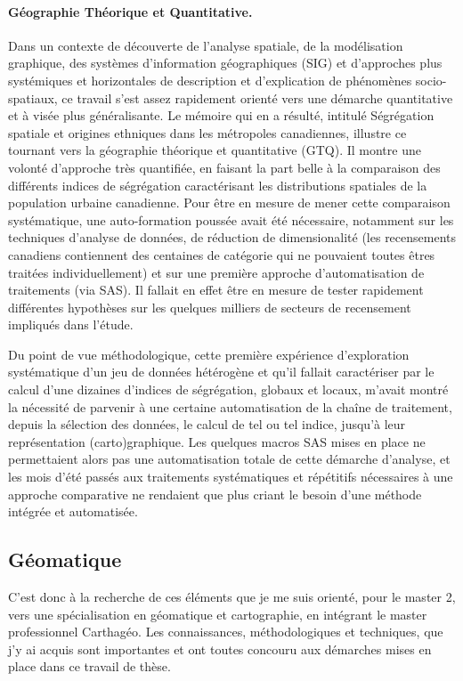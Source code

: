 \paragraph{Géographie Théorique et Quantitative.}
Dans un contexte de découverte de l'analyse spatiale, de la modélisation graphique, des systèmes d'information géographiques (SIG) et d'approches plus systémiques et horizontales de description et d'explication de phénomènes socio-spatiaux, ce travail s'est assez rapidement orienté vers une démarche quantitative et à visée plus généralisante.
Le mémoire qui en a résulté, intitulé \og Ségrégation spatiale et origines ethniques dans les métropoles canadiennes\fg{}, illustre ce tournant vers la géographie théorique et quantitative (GTQ).
Il montre une volonté d'approche très quantifiée, en faisant la part belle à la comparaison des différents indices de ségrégation caractérisant les distributions spatiales de la population urbaine canadienne.
Pour être en mesure de mener cette comparaison systématique, une auto-formation poussée avait été nécessaire, notamment sur les techniques d'analyse de données, de réduction de dimensionalité (les recensements canadiens contiennent des centaines de catégorie qui ne pouvaient toutes êtres traitées individuellement) et sur une première approche d'automatisation de traitements (via SAS).
Il fallait en effet être en mesure de tester rapidement différentes hypothèses sur les quelques milliers de \og secteurs de recensement\fg{} impliqués dans l'étude.

Du point de vue méthodologique, cette première expérience d'exploration systématique d'un jeu de données hétérogène et qu'il fallait caractériser par le calcul d'une dizaines d'indices de ségrégation, globaux et locaux, m'avait montré la nécessité de parvenir à une certaine automatisation de la chaîne de traitement, depuis la sélection des données, le calcul de tel ou tel indice, jusqu'à leur représentation (carto)graphique.
Les quelques macros SAS mises en place ne permettaient alors pas une automatisation totale de cette démarche d'analyse, et les mois d'été passés aux traitements systématiques et répétitifs nécessaires à une approche comparative ne rendaient que plus criant le besoin d'une méthode intégrée et automatisée.

\subsection{Géomatique}

C'est donc à la recherche de ces éléments que je me suis orienté, pour le master 2, vers une spécialisation en géomatique et cartographie, en intégrant le master professionnel Carthagéo.
Les connaissances, méthodologiques et techniques, que j'y ai acquis sont importantes et ont toutes concouru aux démarches mises en place dans ce travail de thèse.

